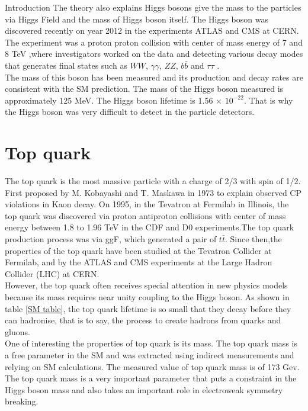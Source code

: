 \begin{chapter}{Introduction}
The theory also explains Higgs bosons give the mass to the particles via Higgs Field and the mass of Higgs boson itself. The Higgs boson was discovered recently on year 2012 in the experiments ATLAS and CMS at CERN. The experiment was a proton proton collision with center of mass energy of 7 and 8 TeV ,where investigators worked on the data and detecting various decay modes that generates final states such  as $WW$, $\gamma \gamma$, $ZZ$, $b\bar{b}$ and $\tau \tau$ \cite{higgsd}. \\
The mass of this boson has been  measured and its production and decay
rates are consistent with the SM prediction. The mass of the Higgs boson measured is 
approximately 125 MeV. The Higgs boson lifetime is 1.56 $\times$ $10^{-22}$. That is why the Higgs boson was very difficult to detect in the particle detectors. \\

\pagebreak

\section{Top quark}
The top quark  is the most massive particle  with a charge of 2/3 with spin of 1/2. First proposed by  M. Kobayashi and T. Maskawa in 1973 to explain observed CP violations in Kaon decay\cite{griff}. On 1995, in the Tevatron at Fermilab in Illinois, the top quark  was discovered via proton antiproton collisions with center of mass energy between 1.8 to 1.96 TeV in the CDF and D0 experiments.The top quark production process was via ggF, which generated a pair of $t\bar{t}$\cite{top}.
Since then,the properties of the top quark have been studied at the Tevatron Collider at Fermilab, and by the ATLAS and CMS experiments at the Large Hadron Collider (LHC) at CERN.\\
However, the top quark often receives special attention in new physics models because its mass requires near unity coupling to the Higgs boson\cite{top}.
As shown in table \ref{SM table}, the top quark lifetime is so small that they decay before they can hadronise, that is to say, the process to create hadrons from quarks and gluons.\\

One of  interesting the properties of top quark is its mass.
The top quark mass is a free parameter in the SM and was extracted using indirect measurements and relying on SM calculations. The measured value of top quark mass is of 173 Gev\cite{pd}.
The top quark mass is a very important
parameter that puts a constraint in the Higgs boson mass and also takes an important role in electroweak symmetry breaking\cite{top}.\\


\end{chapter}
